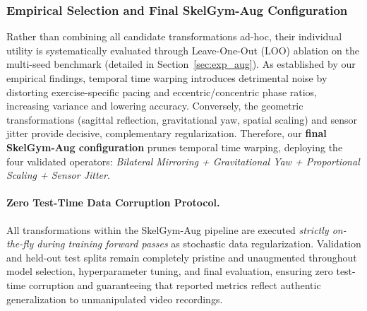 \documentclass[preprint,12pt]{elsarticle}
\begin{document}
\subsubsection{Empirical Selection and Final SkelGym-Aug Configuration}
Rather than combining all candidate transformations ad-hoc, their individual utility is systematically evaluated through Leave-One-Out (LOO) ablation on the multi-seed benchmark (detailed in Section~\ref{sec:exp_aug}). As established by our empirical findings, temporal time warping introduces detrimental noise by distorting exercise-specific pacing and eccentric/concentric phase ratios, increasing variance and lowering accuracy. Conversely, the geometric transformations (sagittal reflection, gravitational yaw, spatial scaling) and sensor jitter provide decisive, complementary regularization. Therefore, our \textbf{final SkelGym-Aug configuration} prunes temporal time warping, deploying the four validated operators: \textit{Bilateral Mirroring + Gravitational Yaw + Proportional Scaling + Sensor Jitter}.

\paragraph{Zero Test-Time Data Corruption Protocol.}
All transformations within the SkelGym-Aug pipeline are executed \textit{strictly on-the-fly during training forward passes} as stochastic data regularization. Validation and held-out test splits remain completely pristine and unaugmented throughout model selection, hyperparameter tuning, and final evaluation, ensuring zero test-time corruption and guaranteeing that reported metrics reflect authentic generalization to unmanipulated video recordings.

\end{document}
